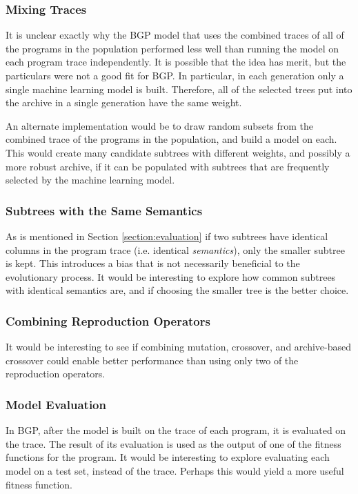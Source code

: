 \subsubsection{Mixing Traces}
It is unclear exactly why the BGP model that uses the combined traces of all of the programs in the population performed less well than running the model on each program trace independently.  It is possible that the idea has merit, but the particulars were not a good fit for BGP.  In particular, in each generation only a single machine learning model is built.  Therefore, all of the selected trees put into the archive in a single generation have the same weight.

An alternate implementation would be to draw random subsets from the combined trace of the programs in the population, and build a model on each.  This would create many candidate subtrees with different weights, and possibly a more robust archive, if it can be populated with subtrees that are frequently selected by the machine learning model.

\subsubsection{Subtrees with the Same Semantics}
As is mentioned in Section \ref{section:evaluation} if two subtrees have identical columns in the program trace (i.e. identical \textit{semantics}), only the smaller subtree is kept.  This introduces a bias that is not necessarily beneficial to the evolutionary process.  It would be interesting to explore how common subtrees with identical semantics are, and if choosing the smaller tree is the better choice.

\subsubsection{Combining Reproduction Operators}
It would be interesting to see if combining mutation, crossover, and archive-based crossover could enable better performance than using only two of the reproduction operators.


\subsubsection{Model Evaluation}
In BGP, after the model is built on the trace of each program, it is evaluated on the trace.  The result of its evaluation is used as the output of one of the fitness functions for the program.  It would be interesting to explore evaluating each model on a test set, instead of the trace.  Perhaps this would yield a more useful fitness function.
